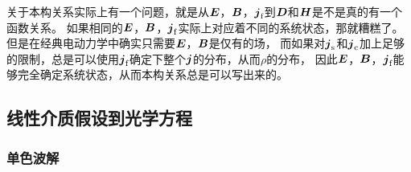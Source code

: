 \documentclass[UTF8, a4paper]{ctexart}
\begin{document}
关于本构关系实际上有一个问题，就是从$\vb*{E}$，$\vb*{B}$，$\vb*{j}_\text{f}$到$\vb*{D}$和$\vb*{H}$是不是真的有一个函数关系。
如果相同的$\vb*{E}$，$\vb*{B}$，$\vb*{j}_\text{f}$实际上对应着不同的系统状态，那就糟糕了。
但是在经典电动力学中确实只需要$\vb*{E}$，$\vb*{B}$是仅有的场，
而如果对$\vb*{j}_\text{s}$和$\vb*{j}_\text{c}$加上足够的限制，总是可以使用$\vb*{j}_\text{f}$确定下整个$\vb*{j}$的分布，从而$\rho$的分布，
因此$\vb*{E}$，$\vb*{B}$，$\vb*{j}_\text{f}$能够完全确定系统状态，从而本构关系总是可以写出来的。

\subsection{线性介质假设到光学方程}

\subsubsection{单色波解}
\end{document}
